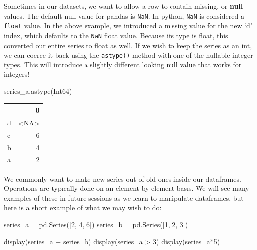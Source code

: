 \documentclass[
  letterpaper,
  DIV=11,
  numbers=noendperiod]{scrreprt}
\newenvironment{Shaded}{\begin{snugshade}}{\end{snugshade}}
\newcommand{\DecValTok}[1]{\textcolor[rgb]{0.68,0.00,0.00}{#1}}
\newcommand{\NormalTok}[1]{\textcolor[rgb]{0.00,0.23,0.31}{#1}}
\newcommand{\OperatorTok}[1]{\textcolor[rgb]{0.37,0.37,0.37}{#1}}
\newcommand{\StringTok}[1]{\textcolor[rgb]{0.13,0.47,0.30}{#1}}
\begin{document}
\begin{tcolorbox}[enhanced jigsaw, rightrule=.15mm, opacitybacktitle=0.6, colback=white, toprule=.15mm, colframe=quarto-callout-tip-color-frame, bottomtitle=1mm, bottomrule=.15mm, arc=.35mm, coltitle=black, breakable, title=\textcolor{quarto-callout-tip-color}{\faLightbulb}\hspace{0.5em}{Beware NaN values!}, titlerule=0mm, opacityback=0, colbacktitle=quarto-callout-tip-color!10!white, left=2mm, toptitle=1mm, leftrule=.75mm]

Sometimes in our datasets, we want to allow a row to contain missing, or
\textbf{null} values. The default null value for pandas is \texttt{NaN}.
In python, \texttt{NaN} is considered a \texttt{float} value. In the
above example, we introduced a missing value for the new `d' index,
which defaults to the \texttt{NaN} float value. Because its type is
float, this converted our entire series to float as well. If we wish to
keep the series as an int, we can coerce it back using the
\texttt{astype()} method with one of the nullable integer types. This
will introduce a slightly different looking null value that works for
integers!

\begin{Shaded}
\begin{Highlighting}[]
\NormalTok{series\_a.astype(}\StringTok{\textquotesingle{}Int64\textquotesingle{}}\NormalTok{)}
\end{Highlighting}
\end{Shaded}

\begin{tabular}{lr}
\toprule
{} &     0 \\
\midrule
d &  <NA> \\
c &     6 \\
b &     4 \\
a &     2 \\
\bottomrule
\end{tabular}

\end{tcolorbox}

We commonly want to make new series out of old ones inside our
dataframes. Operations are typically done on an element by element
basis. We will see many examples of these in future sessions as we learn
to manipulate dataframes, but here is a short example of what we may
wish to do:

\begin{Shaded}
\begin{Highlighting}[]
\NormalTok{series\_a }\OperatorTok{=}\NormalTok{ pd.Series([}\DecValTok{2}\NormalTok{, }\DecValTok{4}\NormalTok{, }\DecValTok{6}\NormalTok{])}
\NormalTok{series\_b }\OperatorTok{=}\NormalTok{ pd.Series([}\DecValTok{1}\NormalTok{, }\DecValTok{2}\NormalTok{, }\DecValTok{3}\NormalTok{])}

\NormalTok{display(series\_a }\OperatorTok{+}\NormalTok{ series\_b)}
\NormalTok{display(series\_a }\OperatorTok{\textgreater{}} \DecValTok{3}\NormalTok{)}
\NormalTok{display(series\_a}\OperatorTok{*}\DecValTok{5}\NormalTok{)}
\end{Highlighting}
\end{Shaded}
\end{document}
